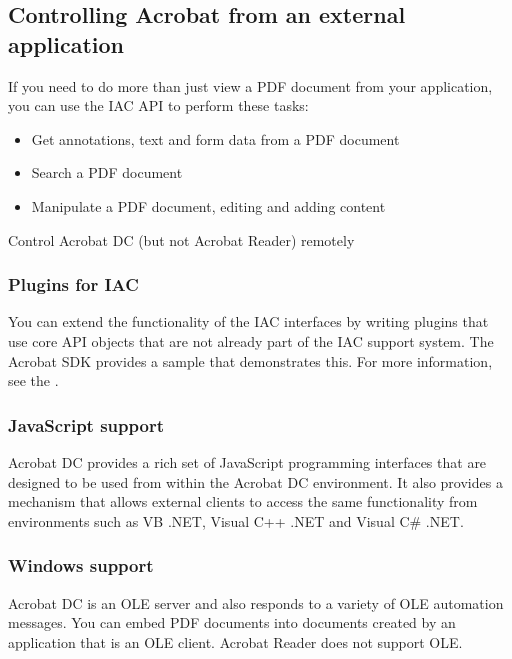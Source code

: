 \documentclass[letterpaper,12pt,english,openany,oneside]{sphinxmanual}
\begin{document}
\subsection{Controlling Acrobat from an external application}
\label{\detokenize{index:controlling-acrobat-from-an-external-application}}
If you need to do more than just view a PDF document from your application, you can use the IAC API to perform these tasks:
\begin{itemize}
\item {} 
Get annotations, text and form data from a PDF document

\item {} 
Search a PDF document

\item {} 
Manipulate a PDF document, editing and adding content

\end{itemize}

Control Acrobat DC (but not Acrobat Reader) remotely




\subsubsection{Plug\sphinxhyphen{}ins for IAC}
\label{\detokenize{index:plug-ins-for-iac}}
You can extend the functionality of the IAC interfaces by writing plug\sphinxhyphen{}ins that use core API objects that are not already part of the IAC support system. The Acrobat SDK provides a sample that demonstrates this. For more information, see the  .


\subsubsection{JavaScript support}
\label{\detokenize{index:javascript-support}}
Acrobat DC provides a rich set of JavaScript programming interfaces that are designed to be used from within the Acrobat DC environment. It also provides a mechanism that allows external clients to access the same functionality from environments such as VB .NET, Visual C++ .NET and Visual C\# .NET.


\subsubsection{Windows support}
\label{\detokenize{index:windows-support}}
Acrobat DC is an OLE server and also responds to a variety of OLE automation messages. You can embed PDF documents into documents created by an application that is an OLE client. Acrobat Reader does not support OLE.
\end{document}
